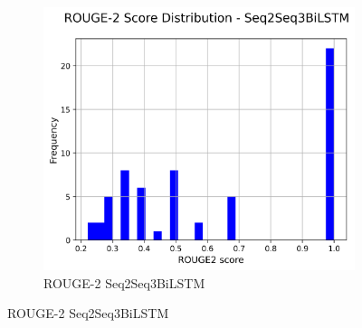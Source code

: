 \documentclass[a4paper, 12pt]{article}
\begin{document}
\begin{figure}[H]
    \hfill
    \begin{subfigure}{0.32\textwidth}
        \centering
        \includegraphics[width=\textwidth]{media/Seq2Seq3BiLSTM_rouge2_scores.png}
        \caption{ROUGE-2 Seq2Seq3BiLSTM}
    \end{subfigure}
    

\end{figure}
\end{document}
